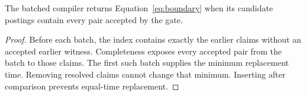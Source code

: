 \begin{proposition}
\label{prop:compiler}
The batched compiler returns Equation~\ref{eq:boundary} when its candidate postings contain every pair accepted by the gate.
\end{proposition}
\begin{proof}
Before each batch, the index contains exactly the earlier claims without an accepted earlier witness.
Completeness exposes every accepted pair from the batch to those claims.
The first such batch supplies the minimum replacement time.
Removing resolved claims cannot change that minimum.
Inserting after comparison prevents equal-time replacement.
\end{proof}
